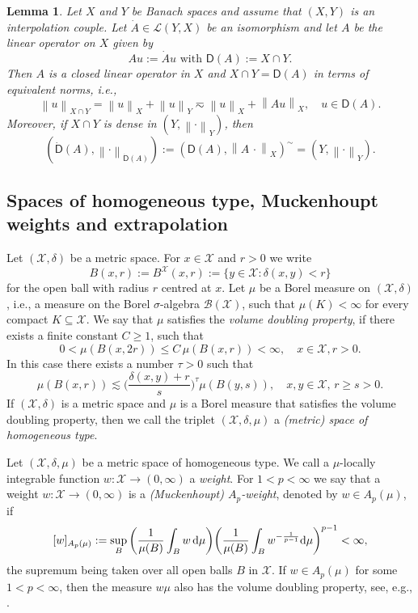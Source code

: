 \documentclass[12pt,a4paper, reqno]{amsart}
\theoremstyle{plain}
\newtheorem{lemma}[theorem]{Lemma}
\theoremstyle{definition}
\theoremstyle{remark}
\numberwithin{equation}{section}
\newcommand{\1}{\mathbbm{1}}
\newcommand{\dd}{\textup{d}}
\newcommand{\calX}{\ensuremath{\mathcal{X}}}
\newcommand{\calB}{\ensuremath{\mathcal{B}}}
\newcommand{\sfD}{\ensuremath{\mathsf{D}}}
\newcommand{\scrL}{\ensuremath{\mathscr{L}}}
\newcommand{\nrm}[1]{\left\lVert #1 \right\rVert}
\begin{document}
\begin{lemma}\label{lem:isom:unbdd}
Let $X$ and $Y$ be Banach spaces and assume that $(X,Y)$ is an interpolation couple. 
Let $\Dot{A}\in\scrL(Y,X)$ be an isomorphism and let $A$ be the linear operator on $X$ given by
\[
Au:= \Dot A u \text{ with } \sfD(A):= X\cap Y.
\]
Then $A$ is a closed linear operator in $X$ and $X\cap Y=\sfD(A)$ in terms of equivalent norms, i.e., 
\[
\nrm{u}_{X\cap Y} = \nrm{u}_X + \nrm{u}_Y \eqsim \nrm{u}_X + \nrm{Au}_X,\quad u\in \sfD(A).
\]
Moreover, if $X\cap Y$ is dense in $(Y,\nrm{\cdot}_Y)$, then
\[
(\Dot{\sfD}(A),\nrm{\cdot}_{\Dot{\sfD}(A)})
:=
(\sfD(A),\nrm{A\,\cdot}_X)^\sim
=
(Y,\nrm{\cdot}_Y).
\]

\end{lemma}
    
\subsection{Spaces of homogeneous type, Muckenhoupt weights and extrapolation}\label{sec:prelim:extrapol}

Let $(\calX,\delta)$ be a metric space. For $x\in \calX$ and $r>0$ we write 
\[B(x,r):=B^\calX(x,r):=\{y\in\calX\colon \delta(x,y)<r\}\]
for the open ball with radius $r$ centred at $x$. 
Let $\mu$ be a Borel measure on $(\calX,\delta)$, i.e., a measure on the Borel $\sigma$-algebra $\calB(\calX)$, such that $\mu(K)<\infty$ for every compact $K\subseteq\calX$. We say that $\mu$ satisfies the \emph{volume doubling property}, if there exists a finite constant $C\geq 1$, such that
\[
0<\mu(B(x,2r))\leq C \,\mu(B(x,r))<\infty,\quad x\in\calX, r>0.
\]
In this case there exists a number $\tau>0$ such that
\begin{equation}\label{eq:doubling:cons2}
\mu(B(x,r))\lesssim \bigg(\frac{\delta(x,y)+r}{s}\bigg)^\tau \mu(B(y,s)),\quad x,y\in\calX,\, r\geq s >0.
\end{equation}
If $(\calX,\delta)$ is a metric space and $\mu$ is a Borel measure that satisfies the volume doubling property, then we call the triplet $(\calX,\delta,\mu)$ a \emph{(metric) space of homogeneous type}.

\medskip

Let $(\calX,\delta,\mu)$ be a metric space of homogeneous type. 
We call a 
$\mu$-locally integrable 
function $w\colon \calX\to (0,\infty)$ a \emph{weight}. For $1<p<\infty$ we say that a weight $w\colon \calX\to (0,\infty)$ is a \emph{(Muckenhoupt) $A_p$-weight}, denoted by $w\in A_p(\mu)$, if 
\[
[w]_{A_p(\mu)}
:= 
\sup_{B} \bigg(\frac{1}{\mu(B)} \int_Bw\, \dd\mu \bigg)\bigg( \frac{1}{\mu(B)}\int_B w^{-\frac{1}{p-1}}\dd\mu\bigg)^{p-1}<\infty,
\]
the supremum being taken over all open balls $B$ in $\calX$. If $w\in A_p(\mu)$ for some $1<p<\infty$, then the measure $w\mu$ also has the volume doubling property, see, e.g., \cite[Lemma~7.7.1(6)]{MitMitMit2022a}. 
\end{document}
